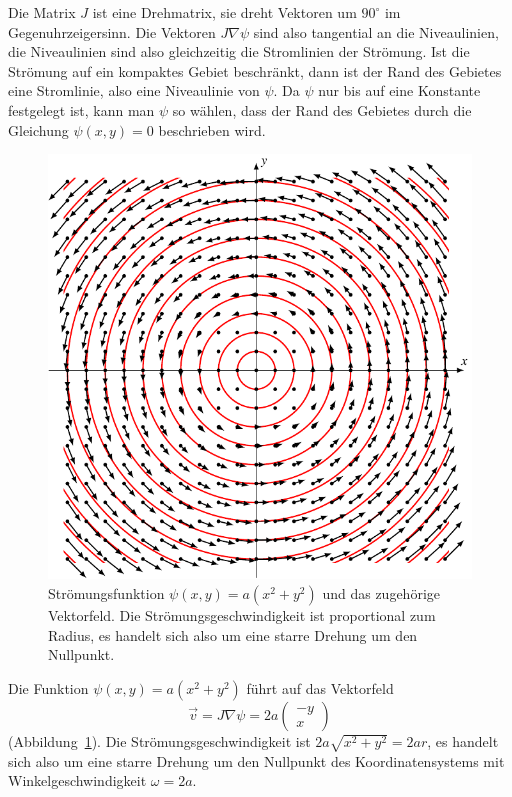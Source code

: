 Die Matrix $J$ ist eine Drehmatrix, sie dreht Vektoren um $90^\circ$ 
im Gegenuhrzeigersinn.
Die Vektoren $J\nabla\psi$ sind also tangential an die Niveaulinien,
die Niveaulinien sind also gleichzeitig die Stromlinien der Strömung.
Ist die Strömung auf ein kompaktes Gebiet beschränkt, dann ist der
Rand des Gebietes eine Stromlinie, also eine Niveaulinie von $\psi$.
Da $\psi$ nur bis auf eine Konstante festgelegt ist, kann man $\psi$
so wählen, dass der Rand des Gebietes durch die Gleichung $\psi(x,y)=0$
beschrieben wird.

\begin{figure}
\centering
\includegraphics{chapters/2/rotation.pdf}
\caption{Strömungsfunktion $\psi(x,y)=a(x^2+y^2)$ und das zugehörige
Vektorfeld.
Die Strömungsgeschwindigkeit ist proportional zum Radius, es handelt
sich also um eine starre Drehung um den Nullpunkt.
\label{skript:rotation}}
\end{figure}
Die Funktion $\psi(x,y)=a(x^2+y^2)$ führt auf das Vektorfeld
\[
\vec{v}
=
J\nabla\psi
=
2a
\begin{pmatrix}
-y\\x
\end{pmatrix}
\]
(Abbildung~\ref{skript:rotation}).
Die Strömungsgeschwindigkeit ist $2a\sqrt{x^2+y^2}=2ar$, es handelt sich
also um eine starre Drehung um den Nullpunkt des Koordinatensystems mit
Winkelgeschwindigkeit $\omega=2a$.

